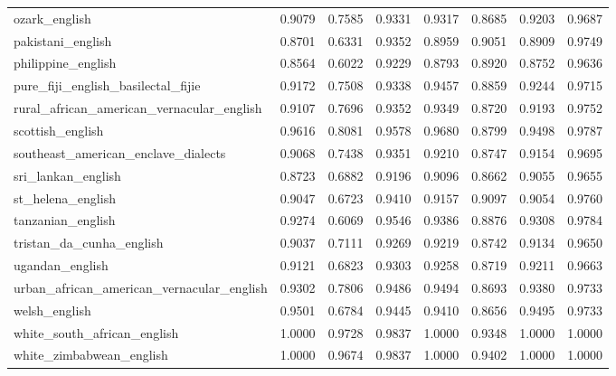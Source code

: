 \begin{landscape}
\begin{longtable}{lccccccc}
ozark\_english & 0.9079 & 0.7585 & 0.9331 & 0.9317 & 0.8685 & 0.9203 & 0.9687 \\
pakistani\_english & 0.8701 & 0.6331 & 0.9352 & 0.8959 & 0.9051 & 0.8909 & 0.9749 \\
philippine\_english & 0.8564 & 0.6022 & 0.9229 & 0.8793 & 0.8920 & 0.8752 & 0.9636 \\
pure\_fiji\_english\_basilectal\_fijie & 0.9172 & 0.7508 & 0.9338 & 0.9457 & 0.8859 & 0.9244 & 0.9715 \\
rural\_african\_american\_vernacular\_english & 0.9107 & 0.7696 & 0.9352 & 0.9349 & 0.8720 & 0.9193 & 0.9752 \\
scottish\_english & 0.9616 & 0.8081 & 0.9578 & 0.9680 & 0.8799 & 0.9498 & 0.9787 \\
southeast\_american\_enclave\_dialects & 0.9068 & 0.7438 & 0.9351 & 0.9210 & 0.8747 & 0.9154 & 0.9695 \\
sri\_lankan\_english & 0.8723 & 0.6882 & 0.9196 & 0.9096 & 0.8662 & 0.9055 & 0.9655 \\
st\_helena\_english & 0.9047 & 0.6723 & 0.9410 & 0.9157 & 0.9097 & 0.9054 & 0.9760 \\
tanzanian\_english & 0.9274 & 0.6069 & 0.9546 & 0.9386 & 0.8876 & 0.9308 & 0.9784 \\
tristan\_da\_cunha\_english & 0.9037 & 0.7111 & 0.9269 & 0.9219 & 0.8742 & 0.9134 & 0.9650 \\
ugandan\_english & 0.9121 & 0.6823 & 0.9303 & 0.9258 & 0.8719 & 0.9211 & 0.9663 \\
urban\_african\_american\_vernacular\_english & 0.9302 & 0.7806 & 0.9486 & 0.9494 & 0.8693 & 0.9380 & 0.9733 \\
welsh\_english & 0.9501 & 0.6784 & 0.9445 & 0.9410 & 0.8656 & 0.9495 & 0.9733 \\
white\_south\_african\_english & 1.0000 & 0.9728 & 0.9837 & 1.0000 & 0.9348 & 1.0000 & 1.0000 \\
white\_zimbabwean\_english & 1.0000 & 0.9674 & 0.9837 & 1.0000 & 0.9402 & 1.0000 & 1.0000 \\
\bottomrule
\end{longtable}
\end{landscape}